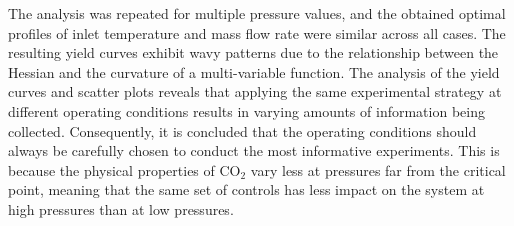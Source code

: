 \documentclass[a4paper,fleqn]{cas-dc}
\begin{document}
The analysis was repeated for multiple pressure values, and the obtained optimal profiles of inlet temperature and mass flow rate were similar across all cases. The resulting yield curves exhibit wavy patterns due to the relationship between the Hessian and the curvature of a multi-variable function. The analysis of the yield curves and scatter plots reveals that applying the same experimental strategy at different operating conditions results in varying amounts of information being collected. Consequently, it is concluded that the operating conditions should always be carefully chosen to conduct the most informative experiments. This is because the physical properties of CO$_2$ vary less at pressures far from the critical point, meaning that the same set of controls has less impact on the system at high pressures than at low pressures. 

\newpage
%



%

\newpage
\end{document}
